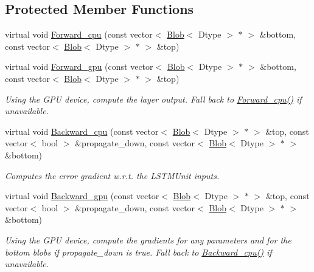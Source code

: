 \subsection*{Protected Member Functions}
\begin{DoxyCompactItemize}
\item 
virtual void \hyperlink{classcaffe_1_1LSTMUnitLayer_a298ab31f0efac45ee4d0e90448e1b6aa}{Forward\+\_\+cpu} (const vector$<$ \hyperlink{classcaffe_1_1Blob}{Blob}$<$ Dtype $>$ $\ast$ $>$ \&bottom, const vector$<$ \hyperlink{classcaffe_1_1Blob}{Blob}$<$ Dtype $>$ $\ast$ $>$ \&top)
\item 
virtual void \hyperlink{classcaffe_1_1LSTMUnitLayer_adc6533e64de0eec9943ef473f91fb666}{Forward\+\_\+gpu} (const vector$<$ \hyperlink{classcaffe_1_1Blob}{Blob}$<$ Dtype $>$ $\ast$ $>$ \&bottom, const vector$<$ \hyperlink{classcaffe_1_1Blob}{Blob}$<$ Dtype $>$ $\ast$ $>$ \&top)\hypertarget{classcaffe_1_1LSTMUnitLayer_adc6533e64de0eec9943ef473f91fb666}{}\label{classcaffe_1_1LSTMUnitLayer_adc6533e64de0eec9943ef473f91fb666}

\begin{DoxyCompactList}\small\item\em Using the G\+PU device, compute the layer output. Fall back to \hyperlink{classcaffe_1_1LSTMUnitLayer_a298ab31f0efac45ee4d0e90448e1b6aa}{Forward\+\_\+cpu()} if unavailable. \end{DoxyCompactList}\item 
virtual void \hyperlink{classcaffe_1_1LSTMUnitLayer_ab93442722c012f0270e15b3b3ea30cf5}{Backward\+\_\+cpu} (const vector$<$ \hyperlink{classcaffe_1_1Blob}{Blob}$<$ Dtype $>$ $\ast$ $>$ \&top, const vector$<$ bool $>$ \&propagate\+\_\+down, const vector$<$ \hyperlink{classcaffe_1_1Blob}{Blob}$<$ Dtype $>$ $\ast$ $>$ \&bottom)
\begin{DoxyCompactList}\small\item\em Computes the error gradient w.\+r.\+t. the L\+S\+T\+M\+Unit inputs. \end{DoxyCompactList}\item 
virtual void \hyperlink{classcaffe_1_1LSTMUnitLayer_a65a777f73b1b4e3d007a7e2309b3f36e}{Backward\+\_\+gpu} (const vector$<$ \hyperlink{classcaffe_1_1Blob}{Blob}$<$ Dtype $>$ $\ast$ $>$ \&top, const vector$<$ bool $>$ \&propagate\+\_\+down, const vector$<$ \hyperlink{classcaffe_1_1Blob}{Blob}$<$ Dtype $>$ $\ast$ $>$ \&bottom)\hypertarget{classcaffe_1_1LSTMUnitLayer_a65a777f73b1b4e3d007a7e2309b3f36e}{}\label{classcaffe_1_1LSTMUnitLayer_a65a777f73b1b4e3d007a7e2309b3f36e}

\begin{DoxyCompactList}\small\item\em Using the G\+PU device, compute the gradients for any parameters and for the bottom blobs if propagate\+\_\+down is true. Fall back to \hyperlink{classcaffe_1_1LSTMUnitLayer_ab93442722c012f0270e15b3b3ea30cf5}{Backward\+\_\+cpu()} if unavailable. \end{DoxyCompactList}\end{DoxyCompactItemize}
